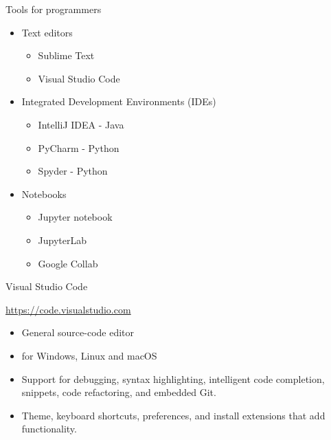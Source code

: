 \documentclass[aspectratio=169,hyperref={unicode}]{beamer}
\begin{document}
\begin{frame}{Tools for programmers}
\begin{itemize}
	\item Text editors
		\begin{itemize}
			\item Sublime Text
			\item Visual Studio Code
		\end{itemize}
	\item Integrated Development Environments (IDEs)
		\begin{itemize}
			\item IntelliJ IDEA - Java
			\item PyCharm - Python
			\item Spyder - Python
		\end{itemize}
	\item Notebooks
		\begin{itemize}
			\item Jupyter notebook 
			\item JupyterLab
			\item Google Collab
		\end{itemize}
\end{itemize}
	
\end{frame}

\begin{frame}{Visual Studio Code}
\begin{center}
	\url{https://code.visualstudio.com}
\end{center}
\begin{itemize}
	\item  General source-code editor 
	\item for Windows, Linux and macOS
	\item Support for debugging, syntax highlighting, intelligent code completion, snippets, code refactoring, and embedded Git. 
	\item Theme, keyboard shortcuts, preferences, and install extensions that add functionality.
\end{itemize}
\end{frame}
\end{document}
